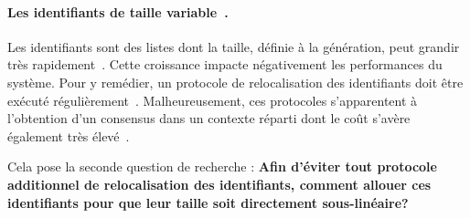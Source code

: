 \paragraph{Les identifiants de taille variable~\cite{weiss2009logoot}.} Les
identifiants sont des listes dont la taille, définie à la génération, peut
grandir très rapidement~\cite{weiss2009logoot}. Cette croissance impacte
négativement les performances du système. Pour y remédier, un protocole de
relocalisation des identifiants doit être exécuté
régulièrement~\cite{zawirskiasynchronous}. Malheureusement, ces protocoles
s'apparentent à l'obtention d'un consensus dans un contexte réparti dont le coût
s'avère également très élevé~\cite{mostefaoui2015signature}.


Cela pose la seconde question de recherche : \textbf{Afin d'éviter tout
  protocole additionnel de relocalisation des identifiants, comment allouer ces
  identifiants pour que leur taille soit directement sous-linéaire?}



